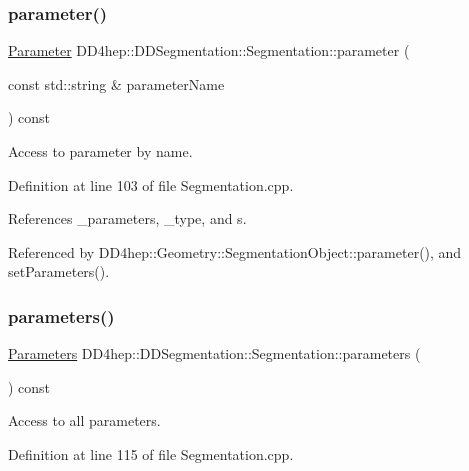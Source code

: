 \subsubsection{\texorpdfstring{parameter()}{parameter()}}
{\footnotesize\ttfamily \hyperlink{namespace_d_d4hep_1_1_d_d_segmentation_af6c6bad2a745d807a0ed00506fb34ccf}{Parameter} D\+D4hep\+::\+D\+D\+Segmentation\+::\+Segmentation\+::parameter (\begin{DoxyParamCaption}\item[{const std\+::string \&}]{parameter\+Name }\end{DoxyParamCaption}) const\hspace{0.3cm}{\ttfamily [virtual]}}



Access to parameter by name. 



Definition at line 103 of file Segmentation.\+cpp.



References \+\_\+parameters, \+\_\+type, and s.



Referenced by D\+D4hep\+::\+Geometry\+::\+Segmentation\+Object\+::parameter(), and set\+Parameters().

\hypertarget{class_d_d4hep_1_1_d_d_segmentation_1_1_segmentation_a1920fda919c1215aa4a76b74fd3b099b}{}\label{class_d_d4hep_1_1_d_d_segmentation_1_1_segmentation_a1920fda919c1215aa4a76b74fd3b099b} 
\subsubsection{\texorpdfstring{parameters()}{parameters()}}
{\footnotesize\ttfamily \hyperlink{namespace_d_d4hep_1_1_d_d_segmentation_af38026430ca0e1ef64acdfc898f5dd3d}{Parameters} D\+D4hep\+::\+D\+D\+Segmentation\+::\+Segmentation\+::parameters (\begin{DoxyParamCaption}{ }\end{DoxyParamCaption}) const\hspace{0.3cm}{\ttfamily [virtual]}}



Access to all parameters. 



Definition at line 115 of file Segmentation.\+cpp.



